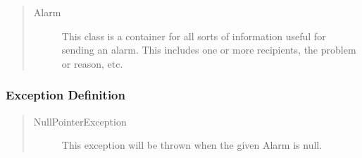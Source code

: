 \begin{quote}
	\begin{description}
		\item[Alarm] This class is a container for all sorts of information useful for
		sending an alarm. This includes one or more recipients, the problem or reason,
		etc.
	\end{description} 
\end{quote}

\subsubsection{Exception Definition} 

\begin{quote}
	\begin{description}
		\item[NullPointerException] This exception will be thrown when the given Alarm
		is null.
	\end{description} 
\end{quote}